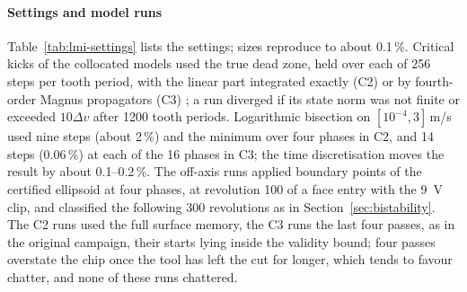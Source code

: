 \paragraph{Settings and model runs}
Table~\ref{tab:lmi-settings} lists the settings; sizes reproduce to about 0.1\,\%. Critical kicks of the collocated models used the true dead zone, held over each of 256 steps per tooth period, with the linear part integrated exactly (C2) or by fourth-order Magnus propagators (C3) \citep{blanes2009magnus}; a run diverged if its state norm was not finite or exceeded $10\Delta v$ after 1200 tooth periods. Logarithmic bisection on $[10^{-4},3]$\,m/s used nine steps (about 2\,\%) and the minimum over four phases in C2, and 14 steps (0.06\,\%) at each of the 16 phases in C3; the time discretisation moves the result by about 0.1--0.2\,\%. The off-axis runs applied boundary points of the certified ellipsoid at four phases, at revolution 100 of a face entry with the \SI{9}{\volt} clip, and classified the following 300 revolutions as in Section~\ref{sec:bistability}. The C2 runs used the full surface memory, the C3 runs the last four passes, as in the original campaign, their starts lying inside the validity bound; four passes overstate the chip once the tool has left the cut for longer, which tends to favour chatter, and none of these runs chattered.
